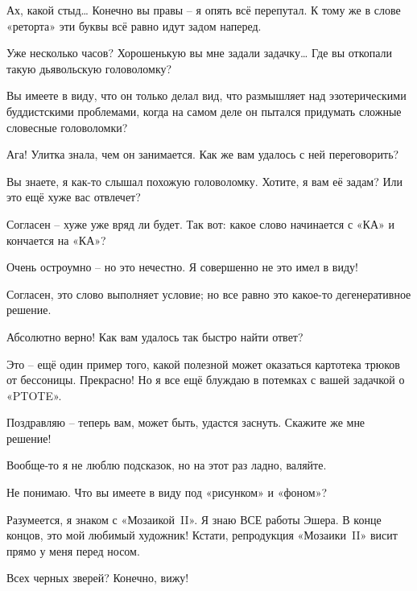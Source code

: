 \documentclass[../main.tex]{subfiles}
\begin{document}
\begin{dialogue}
 Ах, какой стыд\ldots{} Конечно вы правы \--- я опять всё перепутал. К тому же в слове «реторта» эти буквы всё равно идут задом наперед.

 Уже несколько часов? Хорошенькую вы мне задали задачку\ldots{} Где вы откопали такую дьявольскую головоломку?

 Вы имеете в виду, что он только делал вид, что размышляет над эзотерическими буддистскими проблемами, когда на самом деле он пытался придумать сложные словесные головоломки?

 Ага! Улитка знала, чем он занимается. Как же вам удалось с ней переговорить?

 Вы знаете, я как-то слышал похожую головоломку. Хотите, я вам её задам? Или это ещё хуже вас отвлечет?

 Согласен \--- хуже уже вряд ли будет. Так вот: какое слово начинается с «КА» и кончается на «КА»?

 Очень остроумно \--- но это нечестно. Я совершенно не это имел в виду!

 Согласен, это слово выполняет условие; но все равно это какое-то дегенеративное решение.

 Абсолютно верно! Как вам удалось так быстро найти ответ?

 Это \--- ещё один пример того, какой полезной может оказаться картотека трюков от бессоницы. Прекрасно! Но я все ещё блуждаю в потемках с вашей задачкой о «\mbox{PTOTE}».

 Поздравляю \--- теперь вам, может быть, удастся заснуть. Скажите же мне решение!

 Вообще-то я не люблю подсказок, но на этот раз ладно, валяйте.

 Не понимаю. Что вы имеете в виду под «рисунком» и «фоном»?


 Разумеется, я знаком с «Мозаикой~II». Я знаю ВСЕ работы Эшера. В конце концов, это мой любимый художник! Кстати, репродукция «Мозаики~II» висит прямо у меня перед носом.

 Всех черных зверей? Конечно, вижу!


\end{dialogue}
\end{document}
